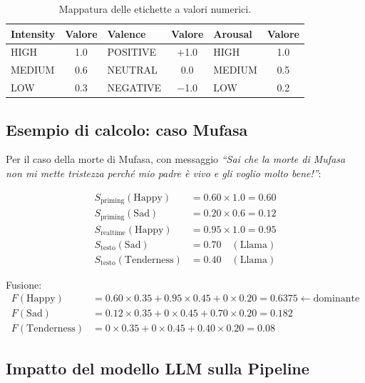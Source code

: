 \documentclass[11pt]{report}
\begin{document}
\begin{table}[H]
    \centering
    \caption{Mappatura delle etichette a valori numerici.}
    \label{tab:label_map}
    \begin{tabular}{lc|lc|lc}
        \toprule
        \textbf{Intensity} & \textbf{Valore} & \textbf{Valence} & \textbf{Valore} & \textbf{Arousal} & \textbf{Valore} \\
        \midrule
        HIGH & 1.0 & POSITIVE & +1.0 & HIGH & 1.0 \\
        MEDIUM & 0.6 & NEUTRAL & 0.0 & MEDIUM & 0.5 \\
        LOW & 0.3 & NEGATIVE & $-$1.0 & LOW & 0.2 \\
        \bottomrule
    \end{tabular}
\end{table}
 
\subsection{Esempio di calcolo: caso Mufasa}
 
Per il caso della morte di Mufasa, con messaggio \textit{``Sai che la morte di Mufasa non mi mette tristezza perché mio padre è vivo e gli voglio molto bene!''}:
 
\begin{align}
    S_\text{priming}(\text{Happy}) &= 0.60 \times 1.0 = 0.60 \nonumber \\
    S_\text{priming}(\text{Sad}) &= 0.20 \times 0.6 = 0.12 \nonumber \\[6pt]
    S_\text{realtime}(\text{Happy}) &= 0.95 \times 1.0 = 0.95 \nonumber \\[6pt]
    S_\text{testo}(\text{Sad}) &= 0.70 \quad (\text{Llama}) \nonumber \\
    S_\text{testo}(\text{Tenderness}) &= 0.40 \quad (\text{Llama}) \nonumber
\end{align}
 
Fusione:
\begin{align}
    F(\text{Happy}) &= 0.60 \times 0.35 + 0.95 \times 0.45 + 0 \times 0.20 = \mathbf{0.6375} \leftarrow \text{dominante} \nonumber \\
    F(\text{Sad}) &= 0.12 \times 0.35 + 0 \times 0.45 + 0.70 \times 0.20 = 0.182 \nonumber \\
    F(\text{Tenderness}) &= 0 \times 0.35 + 0 \times 0.45 + 0.40 \times 0.20 = 0.08 \nonumber
\end{align}
 
\subsection{Impatto del modello LLM sulla Pipeline}
\end{document}
